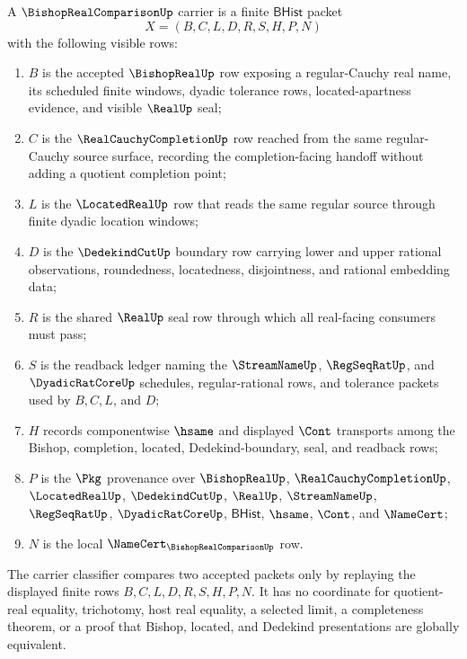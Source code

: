 \begin{definition}
\label{def:bishop-real-comparison-carrier}
A $\BishopRealComparisonUp$ carrier is a finite $\mathsf{BHist}$ packet
$$
X=(B,C,L,D,R,S,H,P,N)
$$
with the following visible rows:
\begin{enumerate}
\item $B$ is the accepted $\BishopRealUp$ row exposing a regular-Cauchy real name, its scheduled finite windows, dyadic tolerance rows, located-apartness evidence, and visible $\RealUp$ seal;
\item $C$ is the $\RealCauchyCompletionUp$ row reached from the same regular-Cauchy source surface, recording the completion-facing handoff without adding a quotient completion point;
\item $L$ is the $\LocatedRealUp$ row that reads the same regular source through finite dyadic location windows;
\item $D$ is the $\DedekindCutUp$ boundary row carrying lower and upper rational observations, roundedness, locatedness, disjointness, and rational embedding data;
\item $R$ is the shared $\RealUp$ seal row through which all real-facing consumers must pass;
\item $S$ is the readback ledger naming the $\StreamNameUp$, $\RegSeqRatUp$, and $\DyadicRatCoreUp$ schedules, regular-rational rows, and tolerance packets used by $B,C,L$, and $D$;
\item $H$ records componentwise $\hsame$ and displayed $\Cont$ transports among the Bishop, completion, located, Dedekind-boundary, seal, and readback rows;
\item $P$ is the $\Pkg$ provenance over $\BishopRealUp$, $\RealCauchyCompletionUp$, $\LocatedRealUp$, $\DedekindCutUp$, $\RealUp$, $\StreamNameUp$, $\RegSeqRatUp$, $\DyadicRatCoreUp$, $\mathsf{BHist}$, $\hsame$, $\Cont$, and $\NameCert$;
\item $N$ is the local $\NameCert_{\BishopRealComparisonUp}$ row.
\end{enumerate}
The carrier classifier compares two accepted packets only by replaying the displayed finite rows $B,C,L,D,R,S,H,P,N$. It has no coordinate for quotient-real equality, trichotomy, host real equality, a selected limit, a completeness theorem, or a proof that Bishop, located, and Dedekind presentations are globally equivalent.
\end{definition}

